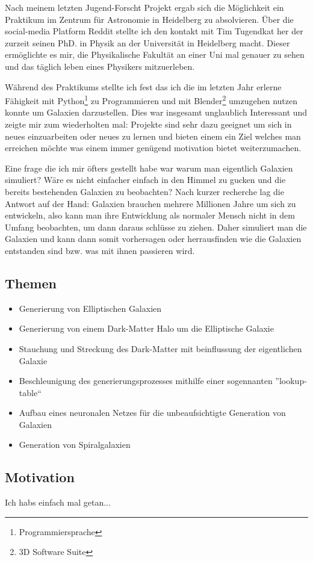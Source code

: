 Nach meinem letzten Jugend-Forscht Projekt ergab sich die Möglichkeit ein
Praktikum im Zentrum für Astronomie in Heidelberg zu absolvieren. Über die
social-media Platform Reddit stellte ich den kontakt mit Tim Tugendkat her
der zurzeit seinen PhD. in Physik an der Universität in Heidelberg macht.
Dieser ermöglichte es mir, die Physikalische Fakultät an einer Uni mal genauer
zu sehen und das täglich leben eines Physikers mitzuerleben.
\par
Während des Praktikums stellte ich fest das ich die im letzten Jahr erlerne Fähigkeit mit
Python\footnote{Programmiersprache} zu Programmieren und mit
Blender\footnote{3D Software Suite} umzugehen nutzen konnte um Galaxien
darzustellen.
Dies war insgesamt unglaublich Interessant und zeigte mir zum wiederholten mal:
Projekte sind sehr dazu geeignet um sich in neues einzuarbeiten oder neues
zu lernen und bieten einem ein Ziel welches man erreichen möchte was einem
immer genügend motivation bietet weiterzumachen.
\par
Eine frage die ich mir öfters gestellt habe war warum man eigentlich Galaxien
simuliert? Wäre es nicht einfacher einfach in den Himmel zu gucken und
die bereits bestehenden Galaxien zu beobachten?
Nach kurzer recherche lag die Antwort auf der Hand: Galaxien brauchen mehrere
Millionen Jahre um sich zu entwickeln, also kann man ihre Entwicklung als
normaler Mensch nicht in dem Umfang beobachten, um dann daraus schlüsse zu
ziehen. Daher simuliert man die Galaxien und kann dann somit vorhersagen oder
herrausfinden wie die Galaxien entstanden sind bzw. was mit ihnen passieren
wird.

\subsection{Themen}

\begin{itemize}
  \item Generierung von Elliptischen Galaxien
  \item Generierung von einem Dark-Matter Halo um die Elliptische Galaxie
  \item Stauchung und Streckung des Dark-Matter mit beinflussung der eigentlichen Galaxie
  \item Beschleunigung des generierungsprozesses mithilfe einer sogennanten ''lookup-table``
  \item Aufbau eines neuronalen Netzes für die unbeaufsichtigte Generation von Galaxien
  \item Generation von Spiralgalaxien
\end{itemize}

\subsection{Motivation}

Ich habs einfach mal getan...
